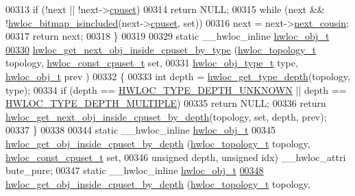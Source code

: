 \begin{DoxyCode}
00313   \textcolor{keywordflow}{if} (!next || !next->\hyperlink{a00016_a67925e0f2c47f50408fbdb9bddd0790f}{cpuset})
00314     \textcolor{keywordflow}{return} NULL;
00315   \textcolor{keywordflow}{while} (next && !\hyperlink{a00065_gaae29e14a926c198e8f91e6e4790621e7}{hwloc_bitmap_isincluded}(next->\hyperlink{a00016_a67925e0f2c47f50408fbdb9bddd0790f}{cpuset}, \textcolor{keyword}{set}))
00316     next = next->\hyperlink{a00016_a85a788017457129589318b6c39451acf}{next_cousin};
00317   \textcolor{keywordflow}{return} next;
00318 \}
00319 
00329 \textcolor{keyword}{static} \_\_hwloc\_inline \hyperlink{a00016}{hwloc_obj_t}
\hypertarget{a00031_source_l00330}{}\hyperlink{a00054_ga934e7ecd68b33403e0c0be779d9ed1e6}{00330} \hyperlink{a00054_ga934e7ecd68b33403e0c0be779d9ed1e6}{hwloc_get_next_obj_inside_cpuset_by_type} (\hyperlink{a00039_ga9d1e76ee15a7dee158b786c30b6a6e38}{hwloc_topology_t} topology, 
      \hyperlink{a00040_ga1f784433e9b606261f62d1134f6a3b25}{hwloc_const_cpuset_t} \textcolor{keyword}{set},
00331                                           \hyperlink{a00041_gacd37bb612667dc437d66bfb175a8dc55}{hwloc_obj_type_t} type, \hyperlink{a00016}{hwloc_obj_t} prev
      )
00332 \{
00333   \textcolor{keywordtype}{int} depth = \hyperlink{a00046_gaea7c64dd59467f5201ba87712710b14d}{hwloc_get_type_depth}(topology, type);
00334   \textcolor{keywordflow}{if} (depth == \hyperlink{a00046_ggaf4e663cf42bbe20756b849c6293ef575a0565ab92ab72cb0cec91e23003294aad}{HWLOC_TYPE_DEPTH_UNKNOWN} || depth == \hyperlink{a00046_ggaf4e663cf42bbe20756b849c6293ef575ae99465995cacde6c210d5fc2e409798c}{HWLOC_TYPE_DEPTH_MULTIPLE})
00335     \textcolor{keywordflow}{return} NULL;
00336   \textcolor{keywordflow}{return} \hyperlink{a00054_ga8af256c2572f16520f95440b884c1bd6}{hwloc_get_next_obj_inside_cpuset_by_depth}(topology, \textcolor{keyword}{set}, depth, prev);
00337 \}
00338 
00344 \textcolor{keyword}{static} \_\_hwloc\_inline \hyperlink{a00016}{hwloc_obj_t}
00345 \hyperlink{a00054_ga57c8a0e227d1b16a31d19aaf755b42c0}{hwloc_get_obj_inside_cpuset_by_depth} (\hyperlink{a00039_ga9d1e76ee15a7dee158b786c30b6a6e38}{hwloc_topology_t} topology, 
      \hyperlink{a00040_ga1f784433e9b606261f62d1134f6a3b25}{hwloc_const_cpuset_t} \textcolor{keyword}{set},
00346                                       \textcolor{keywordtype}{unsigned} depth, \textcolor{keywordtype}{unsigned} idx) \_\_hwloc\_attri
      bute\_pure;
00347 \textcolor{keyword}{static} \_\_hwloc\_inline \hyperlink{a00016}{hwloc_obj_t}
\hypertarget{a00031_source_l00348}{}\hyperlink{a00054_ga57c8a0e227d1b16a31d19aaf755b42c0}{00348} \hyperlink{a00054_ga57c8a0e227d1b16a31d19aaf755b42c0}{hwloc_get_obj_inside_cpuset_by_depth} (\hyperlink{a00039_ga9d1e76ee15a7dee158b786c30b6a6e38}{hwloc_topology_t} topology, 

\end{DoxyCode}
